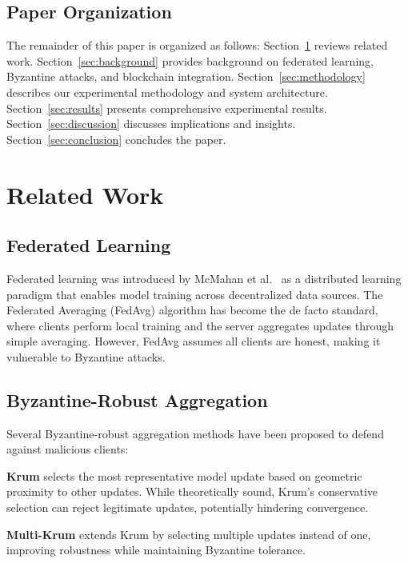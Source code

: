 \documentclass{ieeeaccess}
\begin{document}
\subsection{Paper Organization}

The remainder of this paper is organized as follows: Section~\ref{sec:related} reviews related work. Section~\ref{sec:background} provides background on federated learning, Byzantine attacks, and blockchain integration. Section~\ref{sec:methodology} describes our experimental methodology and system architecture. Section~\ref{sec:results} presents comprehensive experimental results. Section~\ref{sec:discussion} discusses implications and insights. Section~\ref{sec:conclusion} concludes the paper.

\section{Related Work}
\label{sec:related}

\subsection{Federated Learning}

Federated learning was introduced by McMahan et al.~\cite{mcmahan2017communication} as a distributed learning paradigm that enables model training across decentralized data sources. The Federated Averaging (FedAvg) algorithm has become the de facto standard, where clients perform local training and the server aggregates updates through simple averaging. However, FedAvg assumes all clients are honest, making it vulnerable to Byzantine attacks.

\subsection{Byzantine-Robust Aggregation}

Several Byzantine-robust aggregation methods have been proposed to defend against malicious clients:

\textbf{Krum} \cite{blanchard2017machine} selects the most representative model update based on geometric proximity to other updates. While theoretically sound, Krum's conservative selection can reject legitimate updates, potentially hindering convergence.

\textbf{Multi-Krum} extends Krum by selecting multiple updates instead of one, improving robustness while maintaining Byzantine tolerance.
\end{document}
